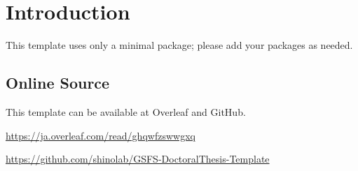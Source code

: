 \chapter{Introduction}

This template uses only a minimal package; please add your packages as needed.

\section{Online Source}

This template can be available at Overleaf and GitHub.

\url{https://ja.overleaf.com/read/ghqwfzswwgxq}

\url{https://github.com/shinolab/GSFS-DoctoralThesis-Template}
